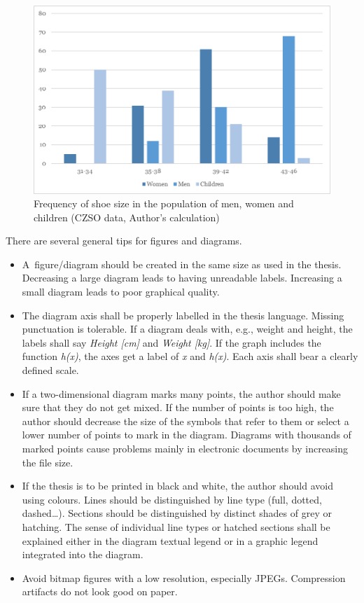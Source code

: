 \begin{figure}[htbp!]\centering
\includegraphics[width=.66\textwidth]{img/example-fig}
\caption{Frequency of shoe size in the population of men, women and children (CZSO data, Author’s calculation)}
\label{fig:freq-shoe-size}
\end{figure}

There are several general tips for figures and diagrams.

\begin{itemize}

\item A~figure/diagram should be created in the same size as used in the thesis. 
Decreasing a large diagram leads to having unreadable labels. Increasing a small 
diagram leads to poor graphical quality.

\item The diagram axis shall be properly labelled in the thesis language. 
Missing punctuation is tolerable. If a diagram deals with, e.g., weight and 
height, the labels shall say \emph{Height [cm]} and \emph{Weight [kg]}. If the 
graph includes the function \emph{h(x)}, the axes get a label of \emph{x} and 
\emph{h(x)}. Each axis shall bear a clearly defined scale. 

\item If a two-dimensional diagram marks many points, the author should make 
sure that they do not get mixed. If the number of points is too high, the author 
should decrease the size of the symbols that refer to them or select a lower 
number of points to mark in the diagram. Diagrams with thousands of marked 
points cause problems mainly in electronic documents by increasing the file 
size. 

\item If the thesis is to be printed in black and white, the author should avoid 
using colours. Lines should be distinguished by line type (full, dotted, 
dashed…). Sections should be distinguished by distinct shades of grey or 
hatching. The sense of individual line types or hatched sections shall be 
explained either in the diagram textual legend or in a graphic legend integrated 
into the diagram. 

\item Avoid bitmap figures with a low resolution, especially JPEGs. Compression 
artifacts do not look good on paper. 

\end{itemize}


